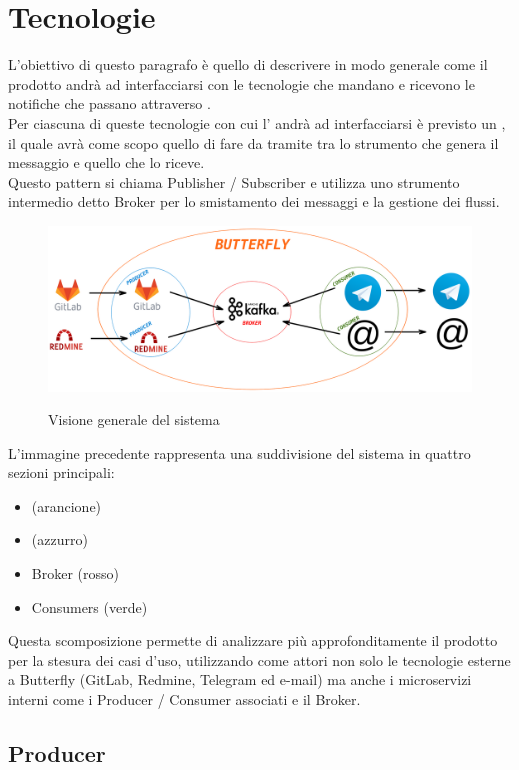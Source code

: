 \section{Tecnologie}
	L'obiettivo di questo paragrafo è quello di descrivere in modo generale come il prodotto andrà ad interfacciarsi con le tecnologie che mandano e ricevono le notifiche che passano attraverso \progetto.\\
	Per ciascuna di queste tecnologie con cui l' andrà ad interfacciarsi è previsto un , il quale avrà come scopo quello di fare da tramite tra lo strumento che genera il messaggio e quello che lo riceve.\\
	Questo pattern si chiama Publisher / Subscriber e utilizza uno strumento intermedio detto Broker per lo smistamento dei messaggi e la gestione dei flussi.

	\begin{figure}[H]
		\centering
		\includegraphics[width=\textwidth]{img/butterfly.png}\\
		\caption{Visione generale del sistema \progetto}
		\label{fig:butterfly}
	\end{figure}
	L'immagine precedente rappresenta una suddivisione del sistema in quattro sezioni principali:
	\begin{itemize}
		\item \progetto (arancione)
		\item {} (azzurro)
		\item Broker (rosso)
		\item Consumers (verde)
	\end{itemize}
	Questa scomposizione permette di analizzare più approfonditamente il prodotto per la stesura dei casi d'uso, utilizzando come attori non solo le tecnologie esterne a Butterfly (GitLab, Redmine, Telegram ed e-mail) ma anche i microservizi interni come i Producer / Consumer associati e il Broker.
	
	\subsection{Producer}
	
